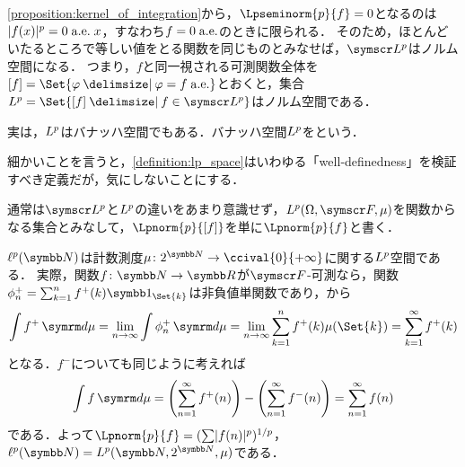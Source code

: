 \documentclass[../../main]{subfiles}
\begin{document}
\cref{proposition:kernel_of_integration}から，\(\Lpseminorm{p}{f}=0\)となるのは\(\abs{f(x)}^p=0\almosteverywhere[][x]\)，すなわち\(f=0\almosteverywhere\)のときに限られる．
そのため，ほとんどいたるところで等しい値をとる関数を同じものとみなせば，\(\Lebesgue*{p}\)はノルム空間になる．
つまり，\(f\)と同一視される可測関数全体を\([f]=\Set{\varphi\given\varphi=f\almosteverywhere}\)とおくと，集合\(\Lebesgue{p}=\Set{[f]\given f\in\Lebesgue*{p}}\)はノルム空間である．

実は，\(\Lebesgue{p}\)はバナッハ空間でもある．バナッハ空間\(\Lebesgue{p}\)をという．


\begin{note}
  細かいことを言うと，\cref{definition:lp_space}はいわゆる「well‐definedness」を検証すべき定義だが，気にしないことにする．
\end{note}

通常は\(\Lebesgue*{p}\)と\(\Lebesgue{p}\)の違いをあまり意識せず，\(\Lebesgue{p}(\Omega,\sigmaalg{F},\mu)\)を関数からなる集合とみなして，\(\Lpnorm{p}{[f]}\)を単に\(\Lpnorm{p}{f}\)と書く．

\begin{example}
  \(\lebesgue{p}(\numset{N})\)は計数測度\(\mu\colon\powerset{\numset{N}}\to\ccival{0}{+\infty}\)に関する\(\Lebesgue{p}\)空間である．
  実際，関数\(f\colon\numset{N}\to\numset{R}\)が\(\sigmaalg{F}\)‐可測なら，関数\(\phi^{\mathord{+}}_n=\sum_{k=1}^nf^{\mathord{+}}(k)\indicator_{\Set{k}}\)は非負値単関数であり，から
  \[
    \int f^{\mathord{+}}\measured{\mu} = \lim_{n\to\infty}\int\phi_n^{\mathord{+}}\measured{\mu}
    = \lim_{n\to\infty}\sum_{k=1}^nf^{\mathord{+}}(k)\mu(\Set{k})
    = \sum_{k=1}^\infty f^{\mathord{+}}(k)
  \]
  となる．\(f^{\mathord{-}}\)についても同じように考えれば
  \[
    \int f\measured{\mu} = \pqty*{\sum_{n=1}^\infty f^{\mathord{+}}(n)}-\pqty*{\sum_{n=1}^\infty f^{\mathord{-}}(n)}
    = \sum_{n=1}^\infty f(n)
  \]
  である．よって\(\Lpnorm{p}{f}=(\sum\abs{f(n)}^p)^{1/p}\)，\(\lebesgue{p}(\numset{N})=\Lebesgue{p}(\numset{N},\powerset{\numset{N}},\mu)\)である．
\end{example}
\end{document}
